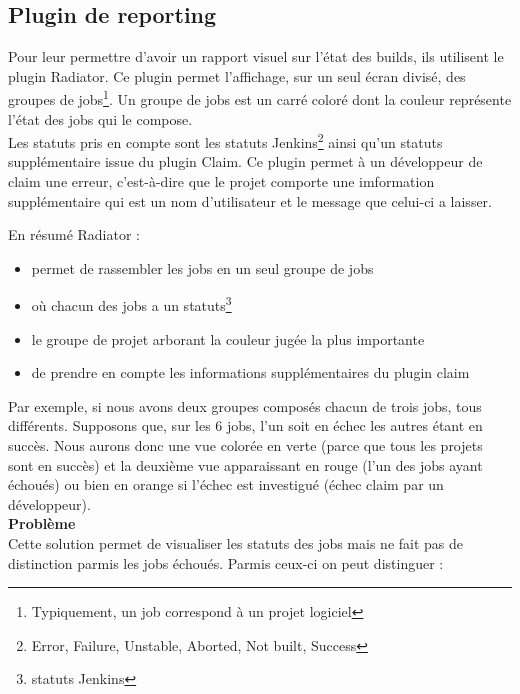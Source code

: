 \subsection{Plugin de reporting}
Pour leur permettre d'avoir un rapport visuel sur l'état des builds, ils utilisent le plugin Radiator. Ce plugin permet l'affichage, sur un seul écran divisé, des groupes de jobs\footnote{Typiquement, un job correspond à un projet logiciel}. Un groupe de jobs est un carré coloré dont la couleur représente l'état des jobs qui le compose.\\
Les statuts pris en compte sont les statuts Jenkins\footnote{Error, Failure, Unstable, Aborted, Not built, Success} ainsi qu'un statuts supplémentaire issue du plugin Claim. Ce plugin permet à un développeur de claim une erreur, c'est-à-dire que le projet comporte une imformation supplémentaire qui est un nom d'utilisateur et le message que celui-ci a laisser.


En résumé Radiator :
\begin{itemize}
	\item permet de rassembler les jobs en un seul groupe de jobs
	\item où chacun des jobs a un statuts\footnote{statuts Jenkins}
	\item le groupe de projet arborant la couleur jugée la plus importante
	\item de prendre en compte les informations supplémentaires du plugin claim
\end{itemize}
Par exemple, si nous avons deux groupes composés chacun de trois jobs, tous différents. Supposons que, sur les 6 jobs, l'un soit en échec les autres étant en succès. Nous aurons donc une vue colorée en verte (parce que tous les projets sont en succès) et la deuxième vue apparaissant en rouge (l'un des jobs ayant échoués) ou bien en orange si l'échec est investigué (échec claim par un développeur).\\




\textbf{Problème}\hfill \\ \indent
Cette solution permet de visualiser les statuts des jobs mais ne fait pas de distinction parmis les jobs échoués. Parmis ceux-ci on peut distinguer :

